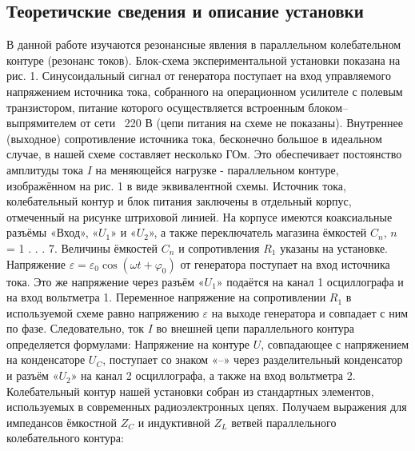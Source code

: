 	\subsection*{Теоретичские сведения и описание установки}
	В данной работе изучаются резонансные явления в параллельном колебательном контуре (резонанс токов). Блок-схема экспериментальной установки показана на рис. 1. Синусоидальный сигнал от генератора поступает на вход управляемого напряжением источника тока, собранного на операционном усилителе с полевым транзистором, питание которого осуществляется встроенным блоком–выпрямителем от сети ~220 В (цепи питания на схеме не показаны). Внутреннее
(выходное) сопротивление источника тока, бесконечно большое в идеальном случае, в нашей схеме составляет несколько ГОм. Это обеспечивает постоянство амплитуды тока $I$ на меняющейся нагрузке - параллельном контуре, изображённом на рис. 1 в виде эквивалентной схемы.
	\n
	Источник тока, колебательный контур и блок питания заключены в
отдельный корпус, отмеченный на рисунке штриховой линией. На корпусе имеются коаксиальные разъёмы «Вход», «$U_1$» и «$U_2$», а также переключатель магазина ёмкостей $C_n$, $n$ = 1 . . . 7. Величины ёмкостей $C_n$ и сопротивления $R_1$ указаны на установке. Напряжение $\varepsilon = \varepsilon_0 \cos(\omega t + \varphi_0)$
от генератора поступает на вход источника тока. Это же напряжение
через разъём «$U_1$» подаётся на канал 1 осциллографа и на вход вольтметра 1. Переменное напряжение на сопротивлении $R_1$ в используемой схеме равно напряжению $\varepsilon$ на выходе генератора и совпадает с ним по фазе. Следовательно, ток $I$ во внешней цепи параллельного контура определяется формулами:
	\n
	Напряжение на контуре $U$, совпадающее с напряжением на конденсаторе $U_C$, поступает со знаком «–» через разделительный конденсатор и разъём «$U_2$» на канал 2 осциллографа, а также на вход вольтметра 2. Колебательный контур нашей установки собран из стандартных элементов, используемых в современных радиоэлектронных цепях. Получаем выражения для импедансов ёмкостной $Z_C$ и индуктивной $Z_L$ ветвей параллельного колебательного контура:
	\n
